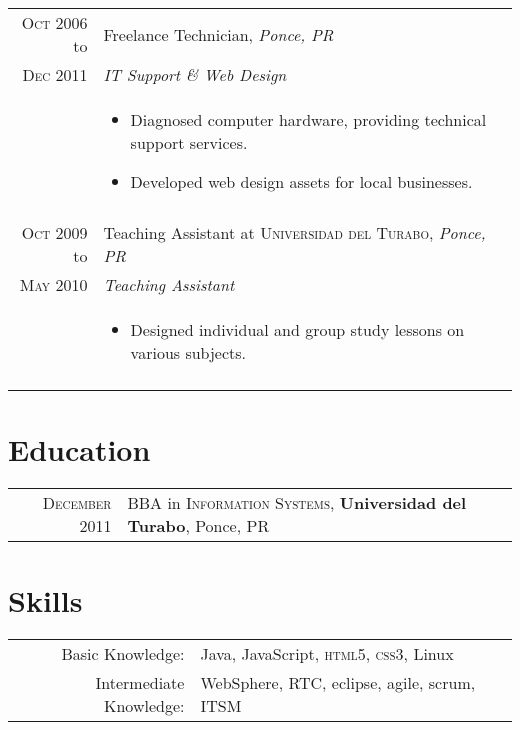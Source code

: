 \documentclass[a4paper,10pt]{article}
\begin{document}
\begin{tabular}{r|p{13cm}}
 \textsc{Oct 2006} \normalsize{to} & \large Freelance Technician, \emph{Ponce, PR} \\
\textsc{Dec 2011} & \emph{IT Support \& Web Design }\\&
 \begin{itemize}
  \setlength\itemsep{.5em}
 \item Diagnosed computer hardware, providing technical support services.
 \item Developed web design assets for local businesses.
 \end{itemize} \\
 \multicolumn{2}{c}{} \\
 
\textsc{Oct 2009} \normalsize{to} & \large Teaching Assistant at \textsc{Universidad del Turabo}, \emph{Ponce, PR} \\
\textsc{May 2010} & \emph{Teaching Assistant}\\&
 \begin{itemize}
  \setlength\itemsep{.5em}
 \item Designed individual and group study lessons on various subjects. 
 \end{itemize} \\
 \multicolumn{2}{c}{} \\
 
\end{tabular}

\section{Education}
\begin{tabular}{rl}	
 \textsc{December} 2011 & BBA in \textsc{Information Systems}, \textbf{Universidad del Turabo}, Ponce, PR\\
\end{tabular}

\section{Skills}
\begin{tabular}{rl}
Basic Knowledge:& \normalsize{Java, JavaScript}, \textsc{html5, css3}, \normalsize{Linux}\\
Intermediate Knowledge:& \normalsize{WebSphere}, \textsc{RTC}, \normalsize{eclipse, agile, scrum}, \textsc{ITSM} \\
\end{tabular}
\end{document}
